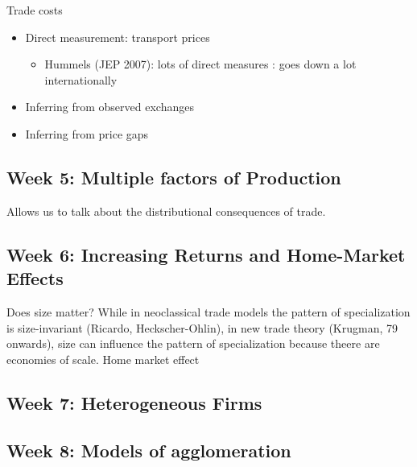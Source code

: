 \documentclass[12pt, final]{article}
\begin{document}
Trade costs
\begin{itemize}
    \item Direct measurement: transport prices
    \begin{itemize}
        \item Hummels (JEP 2007): lots of direct measures : goes down a lot internationally
    \end{itemize}
    \item Inferring from observed exchanges 
    \item Inferring from price gaps
\end{itemize}


\subsection{Week 5: Multiple factors of Production} %
\label{sub:week_5_multiple_factors_of_production}

Allows us to talk about the distributional consequences of trade.


\subsection{Week 6: Increasing Returns and Home-Market Effects} %
\label{sub:week_6_increasing_returns_and_home_market_effects}

Does size matter? While in neoclassical trade models the pattern of specialization is size-invariant (Ricardo, Heckscher-Ohlin), in new trade theory (Krugman, 79 onwards), size can influence the pattern of specialization because theere are economies of scale. Home market effect


\subsection{Week 7: Heterogeneous Firms} %
\label{sub:week_7_heterogeneous_firms}



\subsection{Week 8: Models of agglomeration} %
\label{sub:week_8_models_of_agglomeration}
\end{document}
